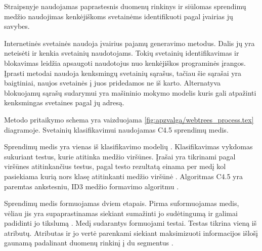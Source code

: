 Straipsnyje  naudojamas paprastesnis duomenų rinkinys ir siūlomas sprendimų medžio naudojimas kenkėjiškoms svetainėms identifikuoti pagal įvairias jų savybes.

Internetinės svetainės naudoja įvairius pajamų generavimo metodus. Dalis jų yra neteisėti ir kenkia svetainių naudotojams. Tokių svetainių identifikavimas ir blokavimas leidžia apsaugoti naudotojus nuo kenkėjiškos programinės įrangos. Įprasti metodai naudoja kenksmingų svetainių sąrašus, tačiau šie sąrašai yra baigtiniai, naujos svetainės į juos pridedamos ne iš karto\cite{webtrees}. Alternatyva blokuojamų sąrašų sudarymui yra mašininio mokymo modelis kuris gali atpažinti kenksmingas svetaines pagal jų adresą.


Metodo pritaikymo schema yra vaizduojama \vref{fig:apzvalga/webtrees_process.tex} diagramoje. Svetainių klasifikavimui naudojamas C4.5 sprendimų medis.


Sprendimų medis yra vienas iš klasifikavimo modelių \cite{c45}. Klasifikavimas vykdomas sukuriant testus, kurie atitinka medžio viršūnes. Įrašai yra tikrinami pagal viršūnes atitinkančius testus, pagal testo rezultatą einama per medį kol pasiekiama kurią nors klasę atitinkanti medžio viršūnė \cite{trees}. Algoritmas C4.5 yra paremtas ankstesniu, ID3 medžio formavimo algoritmu \cite{c45}.

Sprendimų medis formuojamas dviem etapais. Pirma suformuojamas medis, vėliau jis yra supaprastinamas siekiant sumažinti jo sudėtingumą ir galimai padidinti jo tikslumą \cite{c45}. Medį sudarantys formuojami testai. Testas tikrina vieną iš atributų. Atributas ir jo vertė parenkami siekiant maksimizuoti informacijos išlošį gaunamą padalinant duomenų rinkinį į du segmentus \cite{Wu2008}.

